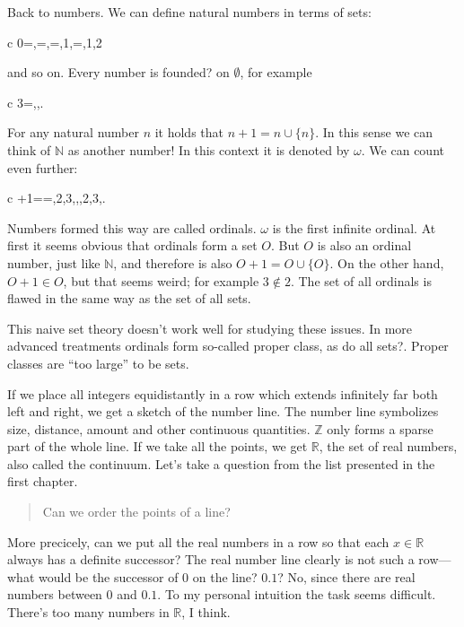 \documentclass[11pt,oneside,%
]{memoir}
\newenvironment{eqna}{\begin{IEEEeqnarray}{c}}{\end{IEEEeqnarray}\ignorespacesafterend}
\theoremstyle{definition}
\newcommand{\NN}{\mathbb{N}}
\newcommand{\RR}{\mathbb{R}}
\newcommand{\ZZ}{\mathbb{Z}}
\begin{document}
Back to numbers. We can define natural numbers in terms of sets:
\begin{eqna}
    0=\emptyset,=\rbrace,=,1\rbrace,=,1,2\rbrace
\end{eqna}
and so on. Every number is founded? on \(\emptyset\), for example
\begin{eqna}
    3=\lbrace\emptyset,\lbrace\emptyset\rbrace,\lbrace\lbrace\emptyset\rbrace\rbrace\rbrace.
\end{eqna}
For any natural number \(n\) it holds that \(n+1=n\cup\lbrace n\rbrace\). In this sense we can think of \(\NN\) as another number! In this context it is denoted by \(\omega\).  We can count even further:
\begin{eqna}
    \omega+1=\omega\cup\lbrace\omega\rbrace=,2,3,\dotsc,,2,3,\dotsc\rbrace\rbrace.
\end{eqna}
Numbers formed this way are called ordinals. \(\omega\) is the first infinite ordinal. At first it seems obvious that ordinals form a set \(O\). But \(O\) is also an ordinal number, just like \(\NN\), and therefore is also \(O+1=O\cup\lbrace O\rbrace\). On the other hand, \(O+1\in O\), but that seems weird; for example \(3\notin 2\). The set of all ordinals is flawed in the same way as the set of all sets.

This naive set theory doesn't work well for studying these issues. In more advanced treatments ordinals form so-called proper class, as do all sets?. Proper classes are ``too large'' to be sets.

If we place all integers equidistantly in a row which extends infinitely far both left and right, we get a sketch of the number line. The number line symbolizes size, distance, amount and other continuous quantities. \(\ZZ\) only forms a sparse part of the whole line. If we take all the points, we get \(\RR\), the set of real numbers, also called the continuum. Let's take a question from the list presented in the first chapter.
\begin{quote}
    Can we order the points of a line?
\end{quote}
More precicely, can we put all the real numbers in a row so that each \(x\in\RR\) always has a definite successor? The real number line clearly is not such a row---what would be the successor of \(0\) on the line? \(0.1\)? No, since there are real numbers between \(0\) and \(0.1\). To my personal intuition the task seems difficult. There's too many numbers in \(\RR\), I think.
\end{document}

